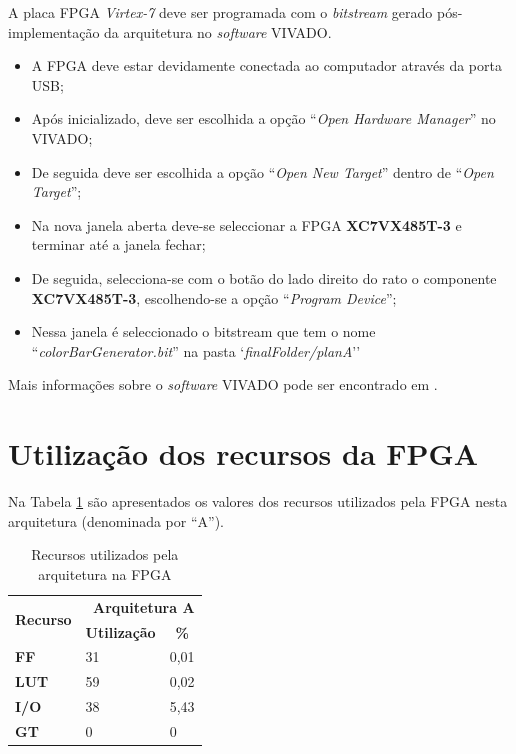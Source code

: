 \documentclass[11pt,a4paper]{article}
\begin{document}
	A placa FPGA \textit{Virtex-7} deve ser programada com o \textit{bitstream} gerado pós-implementação da arquitetura no \textit{software} VIVADO.
	\begin{itemize}
		\item A FPGA deve estar devidamente conectada ao computador através da porta USB;
		\item Após inicializado, deve ser escolhida a opção ``\textit{Open Hardware Manager}'' no VIVADO;
		\item De seguida deve ser escolhida a opção ``\textit{Open New Target}'' dentro de ``\textit{Open Target}'';
		\item Na nova janela aberta deve-se seleccionar a FPGA \textbf{XC7VX485T-3} e terminar até a janela fechar;
		\item De seguida, selecciona-se com o botão do lado direito do rato o componente \textbf{XC7VX485T-3}, escolhendo-se a opção ``\textit{Program Device}'';
		\item Nessa janela é seleccionado o bitstream que tem o nome ``\textit{colorBarGenerator.bit}'' na pasta `\textit{finalFolder/planA}''
	\end{itemize}
	
	Mais informações sobre o \textit{software} VIVADO pode ser encontrado em \cite{R019}.


	\section{Utilização dos recursos da FPGA}
	
	Na Tabela \ref{table:recursosA} são apresentados os valores dos recursos utilizados pela FPGA nesta arquitetura (denominada por ``A'').
		\begin{table}[h!]
			\centering
			\caption{Recursos utilizados pela arquitetura na FPGA}
				\label{table:recursosA}
				\begin{tabular}{l|ll}
					\hline
					\multicolumn{1}{c|}{\multirow{2}{*}{\textbf{Recurso}}} & \multicolumn{2}{r}{\textbf{Arquitetura A}} \\ \cline{2-3} 
					\multicolumn{1}{c|}{}                                  & \multicolumn{1}{c}{\textbf{Utilização}} & \multicolumn{1}{c}{\textbf{\%}} \\ \hline
					\textbf{FF}                                            & 31                                      & 0,01                            \\
					\textbf{LUT}                                           & 59                                      & 0,02                            \\
					\textbf{I/O}                                           & 38                                      & 5,43         			   		\\
					\textbf{GT}                                            & 0                                       & 0                               \\ \hline
				\end{tabular}%
		\end{table}
	
\end{document}
